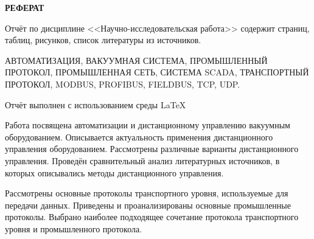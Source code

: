 
	\begin{center}
		\normalsize\bfseries\MakeUppercase{РЕФЕРАТ}
	\end{center}

Отчёт по дисциплине <<Научно-исследовательская работа>> содержит \pageref{LastPage} страниц, \totaltables \xspace таблиц, \totalfigures \xspace рисунков, список литературы из  источников.

АВТОМАТИЗАЦИЯ, ВАКУУМНАЯ СИСТЕМА, ПРОМЫШЛЕННЫЙ \newline ПРОТОКОЛ, ПРОМЫШЛЕННАЯ СЕТЬ, СИСТЕМА SCADA, ТРАНСПОРТНЫЙ ПРОТОКОЛ, MODBUS, PROFIBUS, FIELDBUS, TCP, UDP.

Отчёт выполнен с использованием среды \LaTeX

Работа посвящена автоматизации и дистанционному управлению вакуумным оборудованием. Описывается актуальность применения дистанционного управления оборудованием. Рассмотрены различные варианты дистанционного управления.  Проведён сравнительный анализ литературных источников, в которых описывались методы дистанционного управления.  
	
Рассмотрены основные протоколы транспортного уровня, используемые для передачи данных. Приведены и проанализированы основные промышленные протоколы. Выбрано наиболее подходящее сочетание протокола транспортного уровня и промышленного протокола.


